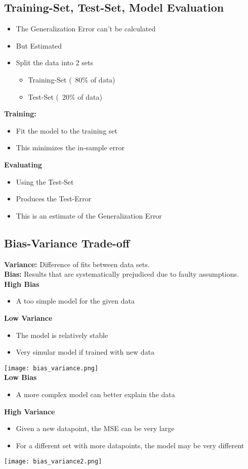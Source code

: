 \subsection{Training-Set, Test-Set, Model Evaluation}
\begin{itemize}
    \item The Generalization Error can't be calculated
    \item But Estimated
    \item Split the data into 2 sets
    \begin{itemize}
        \item Training-Set (~80\% of data)
        \item Test-Set (~20\% of data)
    \end{itemize}
\end{itemize}
\textbf{Training:}
\begin{itemize}
    \item Fit the model to the training set
    \item This minimizes the in-sample error
\end{itemize}
\textbf{Evaluating}
\begin{itemize}
    \item Using the Test-Set
    \item Produces the Test-Error
    \item This is an estimate of the Generalization Error
\end{itemize}

\subsection{Bias-Variance Trade-off}
\textbf{Variance:} Difference of fits between data sets.\\
\textbf{Bias:} Results that are systematically prejudiced due to faulty assumptions.\\

\textbf{High Bias}
\begin{itemize}
    \item A too simple model for the given data
\end{itemize}
\textbf{Low Variance}
\begin{itemize}
    \item The model is relatively stable
    \item Very simular model if trained with new data
\end{itemize}
\texttt{[image: bias\_variance.png]}\\
\textbf{Low Bias}
\begin{itemize}
    \item A more complex model can better explain the data
\end{itemize}
\textbf{High Variance}
\begin{itemize}
    \item Given a new datapoint, the MSE can be very large
    \item For a different set with more datapoints, the model may be very different
\end{itemize}
\texttt{[image: bias\_variance2.png]}

